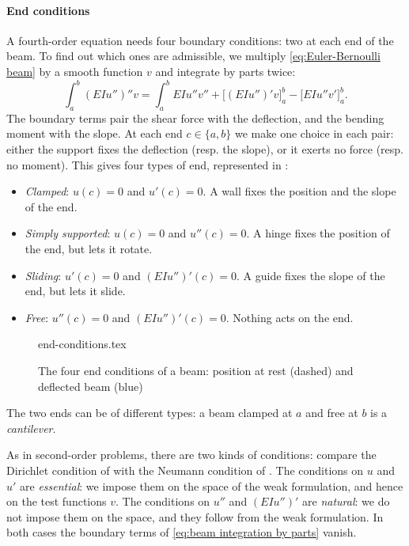 \paragraph{End conditions}
A fourth-order equation needs four boundary conditions: two at each end of the beam.
To find out which ones are admissible, we multiply \eqref{eq:Euler-Bernoulli beam} by a smooth function $v$ and integrate by parts twice:
\begin{equation}
    \label{eq:beam integration by parts}
    \int_a^b (EI u'')'' v = \int_a^b EI u'' v'' + \Big[ (EI u'')' v \Big]_a^b - \Big[ EI u'' v' \Big]_a^b .
\end{equation}
The boundary terms pair the shear force with the deflection, and the bending moment with the slope.
At each end $c \in \{a, b\}$ we make one choice in each pair: either the support fixes the deflection (resp. the slope), or it exerts no force (resp. no moment).
This gives four types of end, represented in :
\begin{itemize}
    \item \emph{Clamped}: $u(c) = 0$ and $u'(c) = 0$. A wall fixes the position and the slope of the end.
    \item \emph{Simply supported}: $u(c) = 0$ and $u''(c) = 0$. A hinge fixes the position of the end, but lets it rotate.
    \item \emph{Sliding}: $u'(c) = 0$ and $(EI u'')'(c) = 0$. A guide fixes the slope of the end, but lets it slide.
    \item \emph{Free}: $u''(c) = 0$ and $(EI u'')'(c) = 0$. Nothing acts on the end.
\end{itemize}
\begin{figure}[H]
    \centering
    {end-conditions.tex}
    \caption{The four end conditions of a beam: position at rest (dashed) and deflected beam (blue)}
    \label{fig:beam end conditions}
\end{figure}
The two ends can be of different types: a beam clamped at $a$ and free at $b$ is a \emph{cantilever}.

As in second-order problems, there are two kinds of conditions: compare the Dirichlet condition of  with the Neumann condition of .
The conditions on $u$ and $u'$ are \emph{essential}: we impose them on the space of the weak formulation, and hence on the test functions $v$.
The conditions on $u''$ and $(EI u'')'$ are \emph{natural}: we do not impose them on the space, and they follow from the weak formulation.
In both cases the boundary terms of \eqref{eq:beam integration by parts} vanish.

